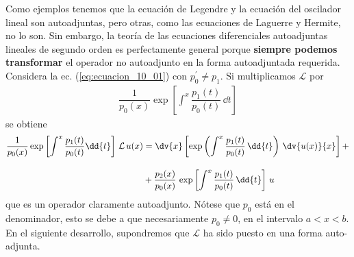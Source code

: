 \par
Como ejemplos tenemos que la ecuación de Legendre y la ecuación del oscilador lineal son autoadjuntas, pero otras, como las ecuaciones de Laguerre y Hermite, no lo son. Sin embargo, la teoría de las ecuaciones diferenciales autoadjuntas lineales de segundo orden es perfectamente general porque \textbf{siempre podemos transformar} el operador no autoadjunto en la forma autoadjuntada requerida. Considera la ec. (\ref{eq:ecuacion_10_01}) con $p_{0}^{\prime} \neq p_{1}$. Si multiplicamos $\mathcal{L}$ por
\begin{align*}
\dfrac{1}{p_{0}(x)} \exp \left[ \int^{x} \dfrac{p_{1}(t)}{p_{0}(t)} \, \dd{t} \right]
\end{align*}
se obtiene
\begin{align}
\begin{aligned}
\dfrac{1}{p_{0}(x)} \exp \left[ \int^{x} \dfrac{p_{1}(t)}{p_{0}(t)} \dd{t} \right] \, \mathcal{L} \, u(x) &= \dv{x} \left[ \exp \left( \int^{x} \dfrac{p_{1}(t)}{p_{0}(t)} \, \dd{t} \right) \, \dv{u(x)}{x} \right] + \\[1em]
&+ \dfrac{p_{2}(x)}{p_{0}(x)} \, \exp \left[ \int^{x} \dfrac{p_{1}(t)}{p_{0}(t)} \, \dd{t} \right] \, u
\end{aligned}
\label{eq:ecuacion_10_07}
\end{align}
que es un operador claramente autoadjunto. Nótese que $p_{0}$ está en el denominador, esto se debe a que necesariamente $p_{0} \neq 0$, en el intervalo $a < x < b$. En el siguiente desarrollo, supondremos que $\mathcal{L}$ ha sido puesto en una forma auto-adjunta.
